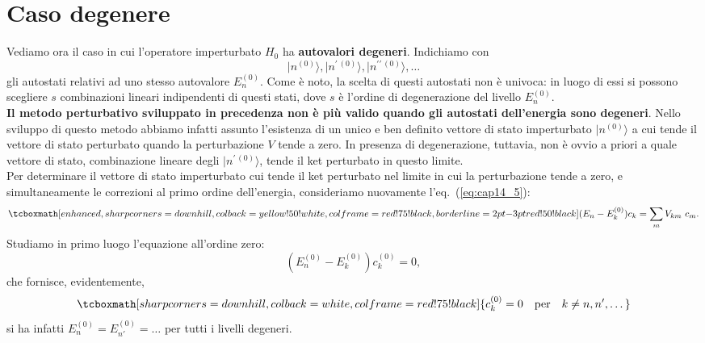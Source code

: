 \section{Caso degenere}
Vediamo ora il caso in cui l'operatore imperturbato $H_0$ ha \textbf{autovalori degeneri}. Indichiamo con
	\begin{equation}
		\vert n^{(0)} \rangle, \vert n^{\prime \,(0)} \rangle, \vert n^{\prime \prime \,(0)} \rangle, \dots
	\end{equation}
gli autostati relativi ad uno stesso autovalore $E_n ^{(0)}$. Come è noto, la scelta di questi autostati non è univoca: in luogo di essi si possono scegliere $s$ combinazioni lineari indipendenti di questi stati, dove $s$ è l'ordine di degenerazione del livello $E_n ^{(0)}$.\\

\textbf{Il metodo perturbativo sviluppato in precedenza non è più valido quando gli autostati dell'energia sono degeneri}. Nello sviluppo di questo metodo abbiamo infatti assunto l'esistenza di un unico e ben definito vettore di stato imperturbato $\vert n ^{(0)}\rangle$ a cui tende il vettore di stato perturbato quando la perturbazione $V$ tende a zero. In presenza di degenerazione, tuttavia, non è ovvio a priori a quale vettore di stato, combinazione lineare degli $\vert n^{\prime \,(0)}\rangle$, tende il ket perturbato in questo limite.\\

Per determinare il vettore di stato imperturbato cui tende il ket perturbato nel limite in cui la perturbazione tende a zero, e simultaneamente le correzioni al primo ordine dell'energia, consideriamo nuovamente l'eq.~(\ref{eq:cap14_5}):
	\begin{equation}
		\tcboxmath[enhanced, sharp corners=downhill, colback=yellow!50!white, colframe=red!75!black, borderline={2pt}{-3pt}{red!50!black}]{
			(E_n - E_k ^{(0)}) c_k = \sum _m V_{km}\ c_m.
			}
	\end{equation}
Studiamo in primo luogo l'equazione all'ordine zero:
	\begin{equation}
		\left( E_n ^{(0)} - E_k ^{(0)} \right) c_ k ^{(0)} =0,
	\end{equation}
che fornisce, evidentemente,
	\begin{equation}
		\tcboxmath[sharp corners=downhill, colback=white, colframe=red!75!black]{
			c_k ^{(0)} =0\quad \textrm{per} \quad k \neq n, n',\dots
			}
	\end{equation}
si ha infatti $E_n ^{(0)} = E_{n'} ^{(0)} = \dots $ per tutti i livelli degeneri.\\

